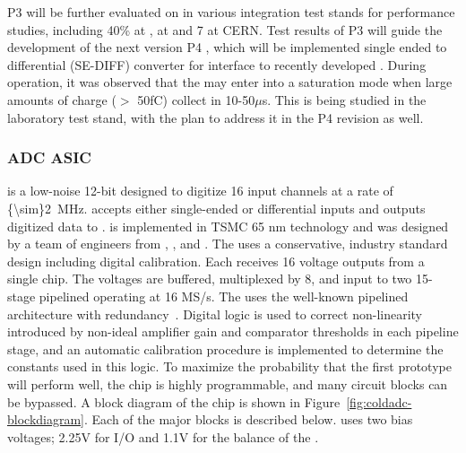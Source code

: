 P3   will be further evaluated on  in various integration test stands for performance studies, including 40\%  at ,   at  and 7 at CERN. Test results of P3   will guide the development of the next version P4  , which will be implemented single ended to differential (SE-DIFF) converter for interface to recently developed  . During  operation, it was observed that the   may enter into a saturation mode when large amounts of charge ($>$ 50fC) collect in 10-50$\mu$s. This is being studied in the laboratory test stand, with the plan to address it in the P4   revision as well.

\subsubsection{ADC ASIC}
\label{sec:fdsp-tpcelec-design-femb-adc}

 is a low-noise 12-bit   designed to digitize 16 input channels at a rate of \SI{{\sim}2}{MHz}.   accepts either single-ended or differential inputs and outputs digitized data to .   is implemented in TSMC 65 nm  technology and was designed by a team of engineers from , , and .  The  uses a conservative, industry standard design including digital calibration.  Each  receives 16 voltage outputs from a single  chip.  The voltages are buffered, multiplexed by 8, and input to two 15-stage pipelined  operating at 16 MS/s.  The  uses the well-known pipelined architecture with redundancy~\cite{PipelinedADC, CalibrationCorrection}.  Digital logic is used to correct non-linearity introduced by non-ideal amplifier gain and comparator thresholds in each pipeline stage, and an automatic calibration procedure is implemented to determine the constants used in this logic.  To maximize the probability that the first prototype  will perform well, the chip is highly programmable, and many circuit blocks can be bypassed.  A block diagram of the chip is shown in Figure~\ref{fig:coldadc-blockdiagram}.  Each of the major blocks is described below.   uses two bias voltages; 2.25V for I/O and 1.1V for the balance of the .

